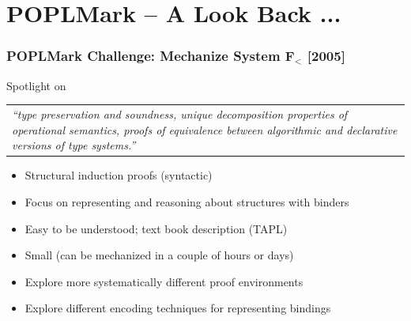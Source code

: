 \documentclass{beamer}
\begin{document}
  \section{POPLMark -- A Look Back ...}

\begin{frame}\frametitle{POPLMark Challenge: Mechanize System F$_<$ [2005]}%


 Spotlight on

 \begin{center}\begin{tabular}{p{10cm}}
 {\small{\emph{``type preservation and soundness, unique decomposition properties of operational semantics, proofs of equivalence between algorithmic and declarative versions of type systems.''}}}
   \end{tabular}
 \end{center}
\begin{itemize}
\item Structural induction proofs (syntactic)
\item Focus on representing and reasoning about structures with binders
\item Easy to be understood; text book description (TAPL)
\item Small (can be mechanized in a couple of hours or days)
\item Explore more systematically different proof environments
\item Explore different encoding techniques for representing bindings
\end{itemize}

\end{frame}
\end{document}
